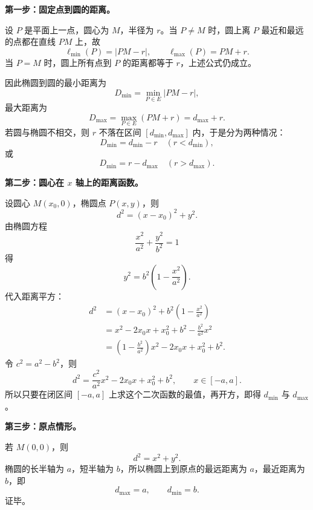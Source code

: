 \begin{proofbox}
\textbf{第一步：固定点到圆的距离。}

设 $P$ 是平面上一点，圆心为 $M$，半径为 $r$。当 $P\ne M$ 时，圆上离 $P$ 最近和最远的点都在直线 $PM$ 上，故
\[
\ell_{\min}(P)=|PM-r|,
\qquad
\ell_{\max}(P)=PM+r.
\]
当 $P=M$ 时，圆上所有点到 $P$ 的距离都等于 $r$，上述公式仍成立。

因此椭圆到圆的最小距离为
\[
D_{\min}=\min_{P\in E}|PM-r|,
\]
最大距离为
\[
D_{\max}=\max_{P\in E}(PM+r)=d_{\max}+r.
\]
若圆与椭圆不相交，则 $r$ 不落在区间 $[d_{\min},d_{\max}]$ 内，于是分为两种情况：
\[
D_{\min}=d_{\min}-r\quad (r<d_{\min}),
\]
或
\[
D_{\min}=r-d_{\max}\quad (r>d_{\max}).
\]

\textbf{第二步：圆心在 $x$ 轴上的距离函数。}

设圆心 $M(x_0,0)$，椭圆点 $P(x,y)$，则
\[
d^2=(x-x_0)^2+y^2.
\]
由椭圆方程
\[
\frac{x^2}{a^2}+\frac{y^2}{b^2}=1
\]
得
\[
y^2=b^2\left(1-\frac{x^2}{a^2}\right).
\]
代入距离平方：
\[
\begin{aligned}
d^2
&=(x-x_0)^2+b^2\left(1-\frac{x^2}{a^2}\right)\\
&=x^2-2x_0x+x_0^2+b^2-\frac{b^2}{a^2}x^2\\
&=\left(1-\frac{b^2}{a^2}\right)x^2-2x_0x+x_0^2+b^2.
\end{aligned}
\]
令 $c^2=a^2-b^2$，则
\[
d^2=\frac{c^2}{a^2}x^2-2x_0x+x_0^2+b^2,
\qquad x\in[-a,a].
\]
所以只要在闭区间 $[-a,a]$ 上求这个二次函数的最值，再开方，即得 $d_{\min}$ 与 $d_{\max}$。

\textbf{第三步：原点情形。}

若 $M(0,0)$，则
\[
d^2=x^2+y^2.
\]
椭圆的长半轴为 $a$，短半轴为 $b$，所以椭圆上到原点的最远距离为 $a$，最近距离为 $b$，即
\[
d_{\max}=a,
\qquad
 d_{\min}=b.
\]
证毕。
\end{proofbox}
